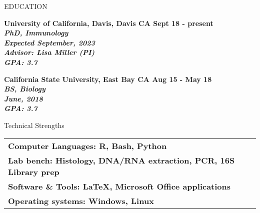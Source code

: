 \documentclass{resume} %
\begin{document}

\begin{rSection}{EDUCATION}

\bf University of California, Davis, Davis CA
\hfill Sept 18 - present\\
\sl PhD, Immunology \\
\textit{Expected} September, 2023\\
\textit{Advisor:} Lisa Miller (PI) \\
\hfill GPA: 3.7

\bf California State University, East Bay CA 
\hfill Aug 15 - May 18\\
\sl BS, Biology \\
\textit June, 2018 \\
\hfill GPA: 3.7

\end{rSection}


\begin{rSection}{Technical Strengths}

\begin{tabular}{ @{} >{\bfseries}l @{\hspace{6ex}}}
Computer Languages: R, Bash, Python \\
Lab bench: Histology, DNA/RNA extraction, PCR, 16S Library prep \\
Software \& Tools: LaTeX, Microsoft Office applications \\
Operating systems: Windows, Linux
\end{tabular}

\end{rSection}

\end{document}
